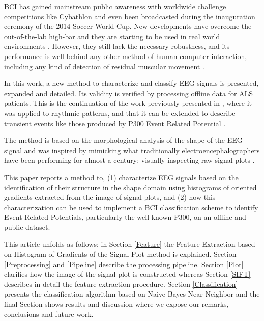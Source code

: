 \documentclass[entropy,article,submit,moreauthors,pdftex,10pt,a4paper]{mdpi}
\begin{document}

BCI has gained mainstream public awareness with worldwide challenge competitions like Cybathlon  \citep{Riener2014} and even been broadcasted during the inauguration ceremony of the 2014 Soccer World Cup.  New developments have overcome the out-of-the-lab high-bar and they are starting to be used in real world environments \citep{Huggins2016}.  However, they still lack the necessary robustness, and its performance is well behind any other method of human computer interaction, including any kind of detection of residual muscular movement \citep{Clerc}.

In this work, a new method to characterize and classify EEG signals is presented, expanded and detailed.  Its validity is verified by processing offline data for ALS patients.  This is the continuation of the work previously presented in \citep{Ramele2016}, where it was applied to rhythmic patterns, and that it can be extended to describe transient events like those produced by P300 Event Related Potential \citep{Knuth2006}.

The method is based on the morphological analysis of the shape of the EEG signal \citep{Alvarado-Gonzalez2016,Yamaguchi2009} and was inspired by mimicking what traditionally electroencephalographers have been performing for almost a century: visually inspecting  raw signal plots \citep{Hartman2005}.

This paper reports a method to, (1) characterize EEG signals based on the identification of their structure in the shape domain using histograms of oriented gradients extracted from the image of signal plots, and (2) how this characterization can be used to implement a BCI classification scheme to identify Event Related Potentials, particularly the well-known P300, on an offline and public dataset.

This article unfolds as follows: in Section \ref{Feature} the Feature Extraction based on Histogram of Gradients of the Signal Plot method is explained. Section \ref{Preprocessing} and \ref{Pipeline} describe the processing pipeline.  Section \ref{Plot}  clarifies how the image of the signal plot is constructed whereas Section \ref{SIFT}  describes in detail the feature extraction procedure.  Section \ref{Classification}  presents the classification algorithm based on Naive Bayes Near Neighbor  and the final Section shows results and discussion where we expose our remarks, conclusions and future work.
\end{document}
